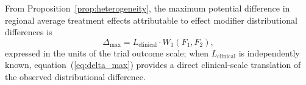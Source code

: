 \documentclass[AMA,Times1COL]{WileyNJDv5}
\begin{document}
From Proposition~\ref{prop:heterogeneity}, the maximum potential difference in regional average treatment effects attributable to effect modifier distributional differences is
\begin{equation}
\Delta_{\max} = L_{\text{clinical}} \cdot W_1(F_1, F_2),
\label{eq:delta_max}
\end{equation}
expressed in the units of the trial outcome scale; when $L_{\text{clinical}}$ is independently known, equation~(\ref{eq:delta_max}) provides a direct clinical-scale translation of the observed distributional difference.
\end{document}
